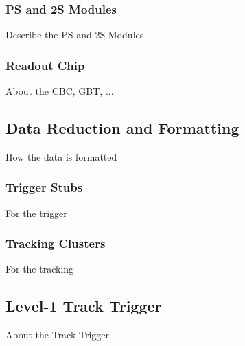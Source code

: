             \subsubsection{PS and 2S Modules}

                Describe the PS and 2S Modules

            \subsubsection{Readout Chip}

                About the CBC, GBT, ...

        \subsection{Data Reduction and Formatting}

            How the data is formatted

            \subsubsection{Trigger Stubs}

                For the trigger

            \subsubsection{Tracking Clusters}

                For the tracking

        \subsection{Level-1 Track Trigger}

            About the Track Trigger
